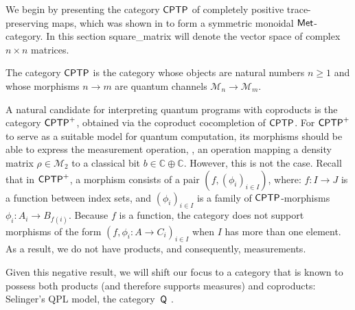 


We begin by presenting the category $\mathsf{CPTP}$ of completely positive trace-preserving maps, which was shown in \cite{dahlqvist2023syntactic} to form a symmetric monoidal $\mathsf{Met}$-category. In this section \gls{square_matrix} will denote the vector space of complex $n\times n$ matrices.


\begin{definition} \label{ex:cat_cptp}
The category $\mathsf{CPTP}$ is the category whose objects are natural numbers $n \geq 1$ and whose morphisms $n \rightarrow m$ are quantum channels $\mathcal{M}_n \rightarrow \mathcal{M}_m$.
\end{definition}


A natural candidate for interpreting quantum programs with coproducts is the category $\mathsf{CPTP}^+$, obtained via the coproduct cocompletion of $\mathsf{CPTP}$. For $\mathsf{CPTP}^+$ to serve as a suitable model for quantum computation, its morphisms should be able to express the measurement operation, \ie, an operation mapping a density matrix $\rho \in \mathcal{M}_2$ to a classical bit $b \in \mathbb{C} \oplus \mathbb{C}$. However, this is not the case.
Recall that in $\mathsf{CPTP}^+$, a morphism consists of a pair $(f, (\phi_i)_{i \in I})$, where: $f \colon I \to J$ is a function between index sets, and
 $(\phi_i)_{i \in I}$ is a family of $\mathsf{CPTP}$-morphisms $\phi_i \colon A_i \to B_{f(i)}$. Because $f$ is a function, the category does not support morphisms of the form $(f,\phi_i \colon A \to C_i)_{i \in I}$ when $I$ has more than one element. As a result, we do not have products, and consequently, measurements.


Given this negative result, we will shift our focus to a category that is known to possess both products (and therefore supports measures) and coproducts: Selinger’s QPL model, the category~$\mathsf{Q}$ \cite{selinger2004towards}.

